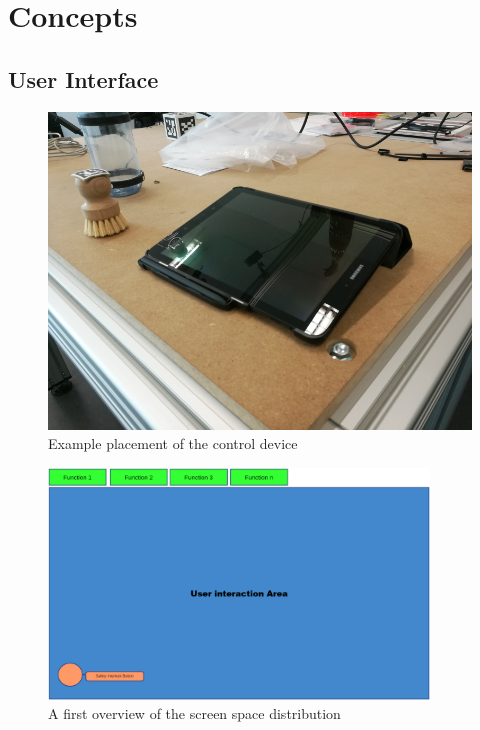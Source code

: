 \chapter{Concepts}
\label{chap:concepts}

\section{User Interface}

\begin{figure}
	\caption{\label{fig:ui:tablet}Example placement of the control device}
	\includegraphics[width=\linewidth]{assets/chpt_concepts/tablet.png}
\end{figure}

\begin{figure}
	\caption{\label{fig:firstmockup}A first overview of the screen space distribution}
	\includegraphics[width=0.9\textwidth]{assets/chpt_concepts/main_touch_interface.png}
\end{figure}

